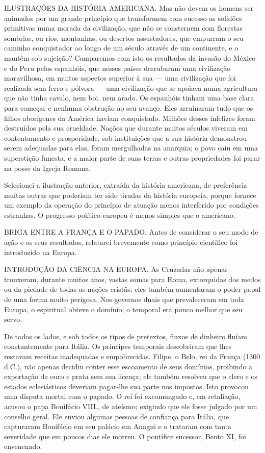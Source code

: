 \documentclass[11pt,a5paper,twoside,openany]{book}
\begin{document}
ILUSTRAÇÕES DA HISTÓRIA AMERICANA. Mas não devem os homens ser animados por um grande princípio que transformem com sucesso as solidões primitivas numa morada da civilização, que não se consternem com florestas sombrias, ou rios, montanhas, ou desertos assustadores, que empurram o seu caminho conquistador ao longo de um século através de um continente, e o mantêm sob sujeição? Comparemos com isto os resultados da invasão do México e do Peru pelos espanhóis, que nesses países derrubaram uma civilização maravilhosa, em muitos aspectos superior à sua — uma civilização que foi realizada sem ferro e pólvora — uma civilização que se apoiava numa agricultura que não tinha cavalo, nem boi, nem arado. Os espanhóis tinham uma base clara para começar e nenhuma obstrução ao seu avanço. Eles arruinaram tudo que os filhos aborígenes da América haviam conquistado. Milhões desses infelizes foram destruídos pela sua crueldade. Nações que durante muitos séculos viveram em contentamento e prosperidade, sob instituições que a sua história demonstrou serem adequadas para elas, foram mergulhadas na anarquia; o povo caiu em uma superstição funesta, e a maior parte de suas terras e outras propriedades foi parar na posse da Igreja Romana.

Selecionei a ilustração anterior, extraída da história americana, de preferência muitas outras que poderiam ter sido tiradas da história europeia, porque fornece um exemplo da operação do princípio de atuação menos interferido por condições estranhas. O progresso político europeu é menos simples que o americano.

BRIGA ENTRE A FRANÇA E O PAPADO. Antes de considerar o seu modo de ação e os seus resultados, relatarei brevemente como princípio científico foi introduzido na Europa.

INTRODUÇÃO DA CIÊNCIA NA EUROPA. As Cruzadas não apenas trouxeram, durante muitos anos, vastas somas para Roma, extorquidas dos medos ou da piedade de todas as nações cristãs; eles também aumentaram o poder papal de uma forma muito perigosa. Nos governos duais que prevaleceram em toda Europa, o espiritual obteve o domínio; o temporal era pouco melhor que seu servo.

De todos os lados, e sob todos os tipos de pretextos, fluxos de dinheiro fluíam constantemente para Itália. Os príncipes temporais descobriram que lhes restavam receitas inadequadas e empobrecidas. Filipe, o Belo, rei da França (1300 d.C.), não apenas decidiu conter esse escoamento de seus domínios, proibindo a exportação de ouro e prata sem sua licença; ele também resolveu que o clero e os estados eclesiásticos deveriam pagar-lhe sua parte nos impostos. Isto provocou uma disputa mortal com o papado. O rei foi excomungado e, em retaliação, acusou o papa Bonifácio VIII., de ateísmo; exigindo que ele fosse julgado por um conselho geral. Ele enviou algumas pessoas de confiança para Itália, que capturaram Bonifácio em seu palácio em Anagni e o trataram com tanta severidade que em poucos dias ele morreu. O pontífice sucessor, Bento XI, foi envenenado.
\end{document}
